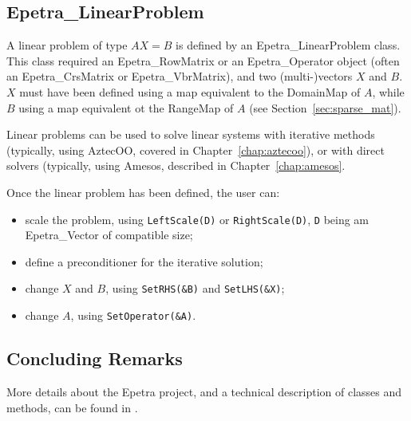 
\subsection{Epetra\_LinearProblem}
\label{sec:linear_problem}

A linear problem of type $A X = B$ is defined by an
Epetra\_LinearProblem class. This class required an Epetra\_RowMatrix or
an Epetra\_Operator object (often an Epetra\_CrsMatrix or
Epetra\_VbrMatrix), and two (multi-)vectors $X$ and $B$. $X$ must have
been defined using a map equivalent to the DomainMap of $A$, while $B$
using a map equivalent ot the RangeMap of $A$ (see
Section~\ref{sec:sparse_mat}).

Linear problems can be used to solve linear systems with iterative
methods (typically, using AztecOO, covered in
Chapter~\ref{chap:aztecoo}), or with direct solvers (typically, using
Amesos, described in Chapter~\ref{chap:amesos}. 

Once the linear problem has been defined, the user can:

\begin{itemize}
\item scale the problem, using \verb!LeftScale(D)! or
  \verb!RightScale(D)!, \verb!D! being am Epetra\_Vector of compatible
  size;
\item define a preconditioner for the iterative solution;
\item change $X$ and $B$, using \verb!SetRHS(&B)! and \verb!SetLHS(&X)!;
\item change $A$, using \verb!SetOperator(&A)!.
\end{itemize}



\subsection{Concluding Remarks}
\label{sec:epetra_concluding}

More details about the Epetra project, and a technical description of
classes and methods, can be found in
\cite{Epetra-Ref-Guide,Epetra-Users-Guide}.

